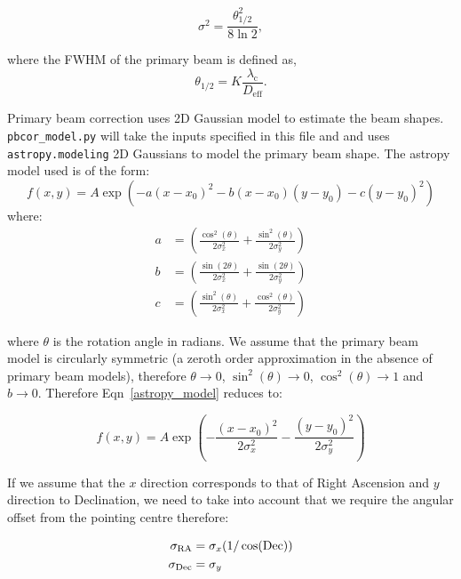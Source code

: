 \documentclass[idxtotoc,hyperref,openany]{article} %
\begin{document}
\begin{equation}
\sigma^2 = \frac{\theta_{1/2}^2}{8\ln{2}}, \label{PB_sigma}
\end{equation} 

\noindent where the FWHM of the primary beam is defined as,
\begin{equation}
\theta_{1/2} = K\frac{\lambda_{\mathrm{c}}}{D_{\mathrm{eff}}}. \label{correction_factors}
\end{equation}

Primary beam correction uses 2D Gaussian model to estimate the beam shapes. \texttt{pbcor\_model.py} will take the inputs specified in this file and and uses \texttt{astropy.modeling} 2D Gaussians to model the primary beam shape. The astropy model used is of the form: 
\begin{equation}
f(x,y)  = A\exp(-a(x-x_0)^2-b(x-x_0)(y-y_0)-c(y-y_0)^2) \label{astropy_model}
\end{equation}
where: 
\begin{align}
a & = \left(\frac{\cos^2(\theta)}{2\sigma_x^2} + \frac{\sin^2(\theta)}{2\sigma_y^2}\right) \\
b & = \left(\frac{\sin(2\theta)}{2\sigma_x^2} + \frac{\sin(2\theta)}{2\sigma_y^2}\right) \\
c & = \left(\frac{\sin^2(\theta)}{2\sigma_x^2} + \frac{\cos^2(\theta)}{2\sigma_y^2}\right)
\end{align}

\noindent where $\theta$ is the rotation angle in radians. We assume that the primary beam model is circularly symmetric (a zeroth order approximation in the absence of primary beam models), therefore $\theta \to 0$, $\sin^2(\theta) \to 0$, $\cos^2(\theta) \to 1$ and $b\to 0$. Therefore Eqn~\ref{astropy_model} reduces to:

\begin{equation}
f(x,y)  = A\exp\left(-\frac{(x-x_0)^2}{2\sigma_x^2}-\frac{(y-y_0)^2}{2\sigma_y^2}\right) \label{astropy_model_symmetric}
\end{equation}

If we assume that the $x$ direction corresponds to that of Right Ascension and $y$ direction to Declination, we need to take into account that we require the angular offset from the pointing centre therefore:

\begin{align}
\sigma_{\rm RA} & = \sigma_x(1/\cos(\rm Dec)) \label{RA_corr}\\
\sigma_{\rm Dec} & = \sigma_y \label{Dec_corr}
\end{align}
\end{document}
